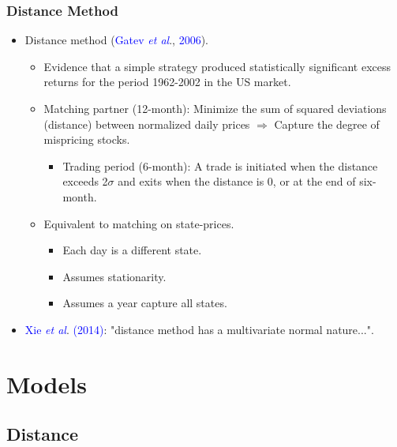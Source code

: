 \documentclass[pdf,10pt,xcolor=dvipsnames,hide notes]{beamer}
\begin{document}
\begin{frame}[label=frame1]
\frametitle{Distance Method}


	\begin{itemize}
		\setlength\itemsep{1em}
	\justifying
			
			\item Distance method (\textcolor{blue}{Gatev \emph{et al}}., \textcolor{blue}{2006}). 
		   \begin{itemize}
		   	
		   	\item<1>  Evidence that a
		   	simple strategy produced statistically significant excess returns for the period 1962-2002 in the US market.
			\pause
			\item<2> Matching partner (12-month): Minimize the sum of squared deviations (distance) between normalized daily prices $\Rightarrow$ Capture the degree of mispricing stocks.
			\begin{itemize}
				\item Trading period (6-month): A trade is initiated when the
				distance exceeds 2$\sigma$ and exits when the distance is 0, or at the end of six-month.  %
			\end{itemize}
			\pause
			\item Equivalent to matching on state-prices.
			\begin{itemize}
				\item Each day is a different state.
				\item Assumes stationarity.
				\item Assumes a year capture all states.
			\end{itemize}
				   \end{itemize}
	\end{itemize}
	
			\begin{itemize}
			\item  \textcolor{blue}{Xie \emph{et al}}. \textcolor{blue}{(2014)}: "distance method has a multivariate normal nature...".
		\end{itemize}
	
	\section{Models}
	\subsection{Distance}
	

\end{frame}
\end{document}
